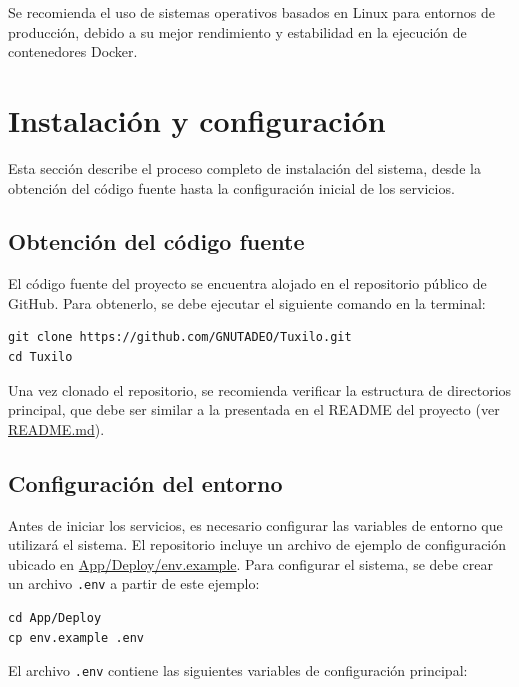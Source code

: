 Se recomienda el uso de sistemas operativos basados en Linux para entornos de producción, debido a su mejor rendimiento y estabilidad en la ejecución de contenedores Docker.

\section{Instalación y configuración}
\label{sec:chp7-2}

Esta sección describe el proceso completo de instalación del sistema, desde la obtención del código fuente hasta la configuración inicial de los servicios.

\subsection{Obtención del código fuente}
\label{subsec:chp7-2-1}

El código fuente del proyecto se encuentra alojado en el repositorio público de GitHub. Para obtenerlo, se debe ejecutar el siguiente comando en la terminal:

\begin{lstlisting}[style=bash]
git clone https://github.com/GNUTADEO/Tuxilo.git
cd Tuxilo
\end{lstlisting}

Una vez clonado el repositorio, se recomienda verificar la estructura de directorios principal, que debe ser similar a la presentada en el README del proyecto (ver \url{README.md}).

\subsection{Configuración del entorno}
\label{subsec:chp7-2-2}

Antes de iniciar los servicios, es necesario configurar las variables de entorno que utilizará el sistema. El repositorio incluye un archivo de ejemplo de configuración ubicado en \url{App/Deploy/env.example}. Para configurar el sistema, se debe crear un archivo \lstinline[style=bash]|.env| a partir de este ejemplo:

\begin{lstlisting}[style=bash]
cd App/Deploy
cp env.example .env
\end{lstlisting}

El archivo \lstinline[style=bash]|.env| contiene las siguientes variables de configuración principal:

